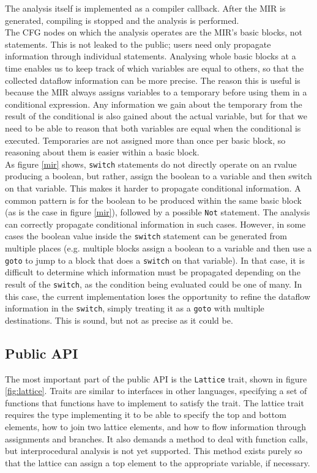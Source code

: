 \documentclass[11pt,a4paper]{article}
\begin{document}
The analysis itself is implemented as a compiler callback. After the MIR is
generated, compiling is stopped and the analysis is performed.\\

The CFG nodes on which the analysis operates are the MIR's basic blocks, 
not statements. This is not leaked to the public; users need only propagate
information through individual statements. Analysing whole basic blocks at
a time enables us to keep track of which variables are equal to others, so 
that the collected dataflow information can be more precise. The reason this is useful
is because the MIR always assigns variables to a temporary before using them
in a conditional expression. Any information we gain about the temporary from 
the result of the conditional is also gained about the actual variable, but for
that we need to be able to reason that both variables are equal when the 
conditional is executed. Temporaries are not assigned more than once per basic block,
so reasoning about them is easier within a basic block. \\

As figure \ref{mir} shows, \texttt{switch} statements do not directly operate on an rvalue
producing a boolean, but rather, assign the boolean to a variable and then switch on
that variable. This makes it harder to propagate conditional information. A common pattern
is for the boolean to be produced within the same basic block (as is the case in figure \ref{mir}), followed by a possible \texttt{Not}
statement. The analysis can correctly propagate conditional information in such cases. However,
in some cases the boolean value inside the \texttt{switch} statement can be generated from multiple
places (e.g. multiple blocks assign a boolean to a variable and then use a \texttt{goto} to jump
to a block that does a \texttt{switch} on that variable). In that case, it is difficult to determine
which information must be propagated depending on the result of the \texttt{switch}, as the condition
being evaluated could be one of many. In this case, the current implementation loses the opportunity to refine the dataflow
information in the \texttt{switch}, simply treating it as a \texttt{goto} with multiple destinations. This is sound,
but not as precise as it could be.

\subsection{Public API}

The most important part of the public API is the \texttt{Lattice} trait,
shown in figure \ref{fig:lattice}. Traits are similar to interfaces in
other languages, specifying a set of functions that functions have to
implement to satisfy the trait. The lattice trait requires the type
implementing it to be able to specify the top and bottom elements, how
to join two lattice elements, and how to flow information through
assignments and branches. It also demands a method to deal with function
calls, but interprocedural analysis is not yet supported. This method
exists purely so that the lattice can assign a top element to the
appropriate variable, if necessary.\\
\end{document}
